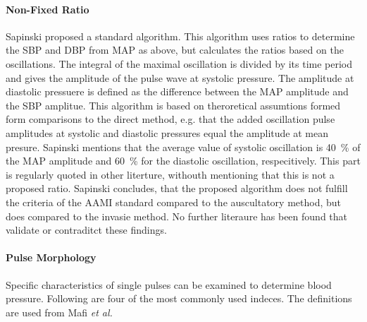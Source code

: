 \paragraph{Non-Fixed Ratio}Sapinski \cite{Sapinski1996} proposed a standard algorithm. This algorithm uses ratios to determine the SBP and DBP from MAP as above, but calculates the ratios based on the oscillations. The integral of the maximal oscillation is divided by its time period and gives the amplitude of the pulse wave at systolic pressure. The amplitude at diastolic pressuere is defined as the difference between the MAP amplitude and the SBP amplitue. This algorithm is based on theroretical assumtions formed form comparisons to the direct method, e.g. that the added oscillation pulse amplitudes at systolic and diastolic pressures equal the amplitude at mean presure. Sapinski mentions that the average value of systolic oscillation is \SI{40}{\%} of the MAP amplitude and \SI{60}{\%} for the diastolic oscillation, respecitively. This part is regularly quoted in other literture, withouth mentioning that this is not a proposed ratio. Sapinski concludes, that the proposed algorithm does not fulfill the criteria of the AAMI standard compared to the auscultatory method, but does compared to the invasie method. No further literaure has been found that validate or contraditct these findings.


\paragraph{Pulse Morphology} Specific characteristics of single pulses can be examined to determine blood pressure. Following are four of the most commonly used indeces. The definitions are used from Mafi \textit{et al.}\cite{Mafi2011} 


